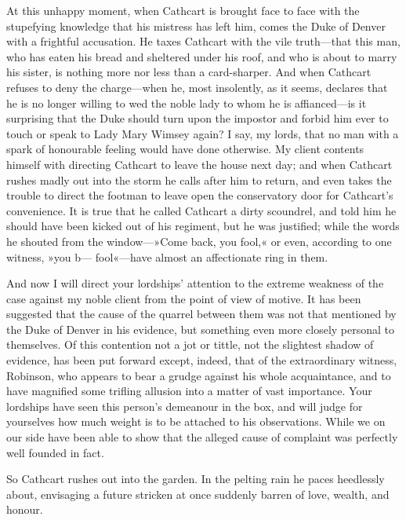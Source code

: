 \begin{dialogue}
\smallskip 

At this unhappy moment, when Cathcart is brought face to face with the stupefying knowledge that his mistress has left him, comes the Duke of Denver with a frightful accusation. He taxes Cathcart with the vile truth—that this man, who has eaten his bread and sheltered under his roof, and who is about to marry his sister, is nothing more nor less than a card-sharper. And when Cathcart refuses to deny the charge—when he, most insolently, as it seems, declares that he is no longer willing to wed the noble lady to whom he is affianced—is it surprising that the Duke should turn upon the impostor and forbid him ever to touch or speak to Lady Mary Wimsey again? I say, my lords, that no man with a spark of honourable feeling would have done otherwise. My client contents himself with directing Cathcart to leave the house next day; and when Cathcart rushes madly out into the storm he calls after him to return, and even takes the trouble to direct the footman to leave open the conservatory door for Cathcart's convenience. It is true that he called Cathcart a dirty scoundrel, and told him he should have been kicked out of his regiment, but he was justified; while the words he shouted from the window—»Come back, you fool,« or even, according to one witness, »you b— fool«—have almost an affectionate ring in them. 

\smallskip 

And now I will direct your lordships' attention to the extreme weakness of the case against my noble client from the point of view of motive. It has been suggested that the cause of the quarrel between them was not that mentioned by the Duke of Denver in his evidence, but something even more closely personal to themselves. Of this contention not a jot or tittle, not the slightest shadow of evidence, has been put forward except, indeed, that of the extraordinary witness, Robinson, who appears to bear a grudge against his whole acquaintance, and to have magnified some trifling allusion into a matter of vast importance. Your lordships have seen this person's demeanour in the box, and will judge for yourselves how much weight is to be attached to his observations. While we on our side have been able to show that the alleged cause of complaint was perfectly well founded in fact.

\smallskip 

So Cathcart rushes out into the garden. In the pelting rain he paces heedlessly about, envisaging a future stricken at once suddenly barren of love, wealth, and honour.


\end{dialogue}

